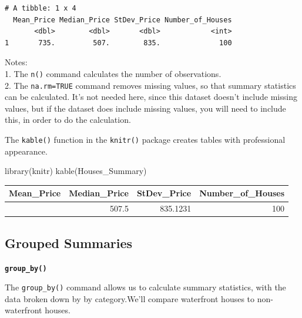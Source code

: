 \documentclass[
  letterpaper,
  DIV=11,
  numbers=noendperiod]{scrreprt}
\newenvironment{Shaded}{\begin{snugshade}}{\end{snugshade}}
\newcommand{\FunctionTok}[1]{\textcolor[rgb]{0.28,0.35,0.67}{#1}}
\newcommand{\NormalTok}[1]{\textcolor[rgb]{0.00,0.23,0.31}{#1}}
\begin{document}
\begin{verbatim}
# A tibble: 1 x 4
  Mean_Price Median_Price StDev_Price Number_of_Houses
       <dbl>        <dbl>       <dbl>            <int>
1       735.         507.        835.              100
\end{verbatim}

Notes:\\
1. The \texttt{n()} command calculates the number of observations.\\
2. The \texttt{na.rm=TRUE} command removes missing values, so that
summary statistics can be calculated. It's not needed here, since this
dataset doesn't include missing values, but if the dataset does include
missing values, you will need to include this, in order to do the
calculation.

The \texttt{kable()} function in the \texttt{knitr()} package creates
tables with professional appearance.

\begin{Shaded}
\begin{Highlighting}[]
\FunctionTok{library}\NormalTok{(knitr)}
\FunctionTok{kable}\NormalTok{(Houses\_Summary)}
\end{Highlighting}
\end{Shaded}

\begin{longtable}[]{@{}rrrr@{}}
\toprule\noalign{}
Mean\_Price & Median\_Price & StDev\_Price & Number\_of\_Houses \\
\midrule\noalign{}
\endhead
\bottomrule\noalign{}
\endlastfoot
735.3525 & 507.5 & 835.1231 & 100 \\
\end{longtable}

\subsection{Grouped Summaries}\label{grouped-summaries}

\textbf{\texttt{group\_by()}}

The \texttt{group\_by()} command allows us to calculate summary
statistics, with the data broken down by by category.We'll compare
waterfront houses to non-waterfront houses.
\end{document}
